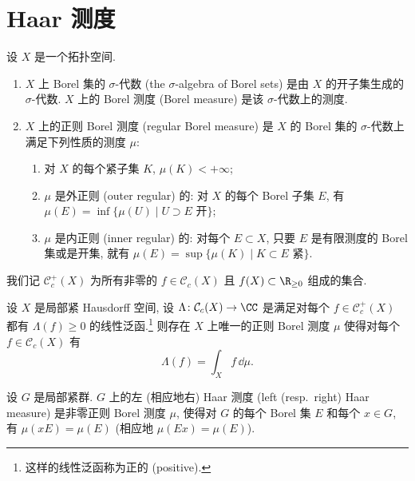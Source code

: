 \section{Haar 测度}

\begin{definition}
\label{def:I.2.1}
设 $X$ 是一个拓扑空间.
\begin{enumerate}
\item[(1)] $X$ 上 Borel 集的 $\sigma$-代数 (the $\sigma$-algebra of Borel sets) 是由 $X$ 的开子集生成的 $\sigma$-代数. $X$ 上的 Borel 测度 (Borel measure) 是该 $\sigma$-代数上的测度.
\item[(2)] $X$ 上的正则 Borel 测度 (regular Borel measure) 是 $X$ 的 Borel 集的 $\sigma$-代数上满足下列性质的测度 $\mu$:
  \begin{enumerate}
  \item[(a)] 对 $X$ 的每个紧子集 $K$, $\mu(K) < +\infty$;
  \item[(b)] $\mu$ 是外正则 (outer regular) 的: 对 $X$ 的每个 Borel 子集 $E$, 有 $\mu(E) = \inf\{\mu(U) \mid U \supset E \text{ 开}\}$;
  \item[(c)] $\mu$ 是内正则 (inner regular) 的: 对每个 $E \subset X$, 只要 $E$ 是有限测度的 Borel 集或是开集, 就有 $\mu(E) = \sup\{\mu(K) \mid K \subset E \text{ 紧}\}$.
  \end{enumerate}
\end{enumerate}
\end{definition}

\begin{notation}[非负紧支撑函数]
\label{not:I.2.2}
我们记 $\mathcal{C}_c^+(X)$ 为所有非零的 $f \in \mathcal{C}_c(X)$ 且 $f(X) \subset \R_{\geq 0}$ 组成的集合.
\end{notation}

\begin{theorem}
\label{thm:I.2.3}
设 $X$ 是局部紧 Hausdorff 空间, 设 $\Lambda \colon \mathcal{C}_c(X) \to \CC$ 是满足对每个 $f \in \mathcal{C}_c^+(X)$ 都有 $\Lambda(f) \geq 0$ 的线性泛函.\footnote{这样的线性泛函称为正的 (positive).} 则存在 $X$ 上唯一的正则 Borel 测度 $\mu$ 使得对每个 $f \in \mathcal{C}_c(X)$ 有
\[
\Lambda(f) = \int_X f \,\dd\mu.
\]
\end{theorem}

\begin{definition}[左/右 Haar 测度]
\label{def:I.2.4}
设 $G$ 是局部紧群. $G$ 上的左 (相应地右) Haar 测度 (left (resp.\ right) Haar measure) 是非零正则 Borel 测度 $\mu$, 使得对 $G$ 的每个 Borel 集 $E$ 和每个 $x \in G$, 有 $\mu(xE) = \mu(E)$ (相应地 $\mu(Ex) = \mu(E)$).
\end{definition}

